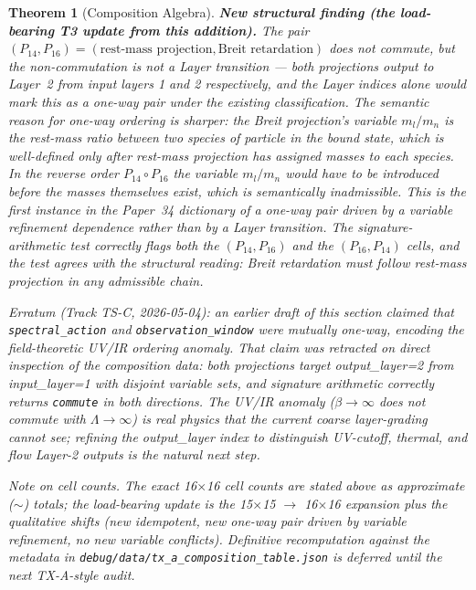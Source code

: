 \documentclass[11pt]{article}
\newtheorem{theorem}{Theorem}
\begin{document}
\begin{theorem}[Composition Algebra]
\textbf{New structural finding (the load-bearing T3 update from
this addition).}  The pair
$(P_{14}, P_{16}) = (\text{rest-mass projection},
\text{Breit retardation})$ does \emph{not} commute, but the
non-commutation is \emph{not} a Layer transition --- both projections
output to Layer~2 from input layers 1 and 2 respectively, and the
Layer indices alone would mark this as a one-way pair under the
existing classification.  The \emph{semantic} reason for one-way
ordering is sharper: the Breit projection's variable $m_l/m_n$ is
the rest-mass ratio between two species of particle in the bound
state, which is well-defined only after rest-mass projection has
assigned masses to each species.  In the reverse order
$P_{14} \circ P_{16}$ the variable $m_l/m_n$ would have to be
introduced before the masses themselves exist, which is semantically
inadmissible.  This is the first instance in the Paper~34 dictionary
of a one-way pair driven by a \emph{variable refinement} dependence
rather than by a Layer transition.  The signature-arithmetic test
correctly flags both the
$(P_{14}, P_{16})$ and the
$(P_{16}, P_{14})$ cells, and the test agrees with the structural
reading: Breit retardation must follow rest-mass projection in any
admissible chain.

\textit{Erratum (Track TS-C, 2026-05-04):} an earlier draft of this
section claimed that \texttt{spectral\_action} and
\texttt{observation\_window} were mutually one-way, encoding the
field-theoretic UV/IR ordering anomaly.  That claim was retracted
on direct inspection of the composition data: both projections
target output\_layer=2 from input\_layer=1 with disjoint variable
sets, and signature arithmetic correctly returns \texttt{commute}
in both directions.  The UV/IR anomaly ($\beta \to \infty$ does not
commute with $\Lambda \to \infty$) is real physics that the current
coarse layer-grading cannot see; refining the output\_layer index
to distinguish UV-cutoff, thermal, and flow Layer-2 outputs is the
natural next step.

\textit{Note on cell counts.}  The exact 16$\times$16 cell counts
are stated above as approximate ($\sim$) totals; the load-bearing
update is the 15$\times$15 $\to$ 16$\times$16 expansion plus the
qualitative shifts (new idempotent, new one-way pair driven by
variable refinement, no new variable conflicts).  Definitive
recomputation against the metadata in
\texttt{debug/data/tx\_a\_composition\_table.json} is deferred until
the next TX-A-style audit.


\end{theorem}
\end{document}

